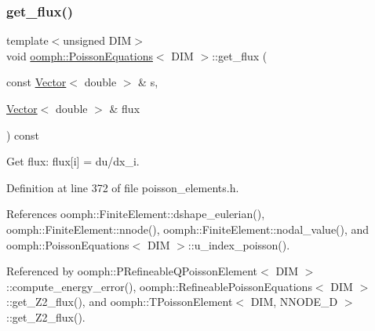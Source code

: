 \subsubsection{\texorpdfstring{get\+\_\+flux()}{get\_flux()}}
{\footnotesize\ttfamily template$<$unsigned D\+IM$>$ \\
void \hyperlink{classoomph_1_1PoissonEquations}{oomph\+::\+Poisson\+Equations}$<$ D\+IM $>$\+::get\+\_\+flux (\begin{DoxyParamCaption}\item[{const \hyperlink{classoomph_1_1Vector}{Vector}$<$ double $>$ \&}]{s,  }\item[{\hyperlink{classoomph_1_1Vector}{Vector}$<$ double $>$ \&}]{flux }\end{DoxyParamCaption}) const\hspace{0.3cm}{\ttfamily [inline]}}



Get flux\+: flux\mbox{[}i\mbox{]} = du/dx\+\_\+i. 



Definition at line 372 of file poisson\+\_\+elements.\+h.



References oomph\+::\+Finite\+Element\+::dshape\+\_\+eulerian(), oomph\+::\+Finite\+Element\+::nnode(), oomph\+::\+Finite\+Element\+::nodal\+\_\+value(), and oomph\+::\+Poisson\+Equations$<$ D\+I\+M $>$\+::u\+\_\+index\+\_\+poisson().



Referenced by oomph\+::\+P\+Refineable\+Q\+Poisson\+Element$<$ D\+I\+M $>$\+::compute\+\_\+energy\+\_\+error(), oomph\+::\+Refineable\+Poisson\+Equations$<$ D\+I\+M $>$\+::get\+\_\+\+Z2\+\_\+flux(), and oomph\+::\+T\+Poisson\+Element$<$ D\+I\+M, N\+N\+O\+D\+E\+\_\+D $>$\+::get\+\_\+\+Z2\+\_\+flux().

\mbox{\label{classoomph_1_1PoissonEquations_a05d8a527a6fe79e7506c5756d9fddd77}} 
